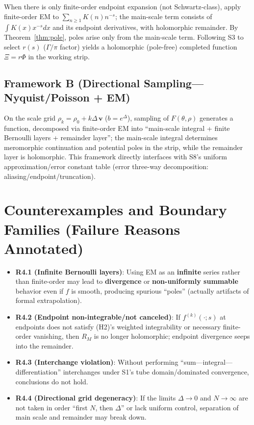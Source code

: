 \documentclass[11pt,a4paper]{article}
\theoremstyle{remark}
\begin{document}
When there is only finite-order endpoint expansion (not Schwartz-class), apply finite-order EM to $\sum_{n\ge1}K(n)n^{-s}$; the main-scale term consists of $\int K(x)x^{-s}dx$ and its endpoint derivatives, with holomorphic remainder. By Theorem~\ref{thm:pole}, poles arise only from the main-scale term. Following S3 to select $r(s)$ ($\Gamma/\pi$ factor) yields a holomorphic (pole-free) completed function $\Xi=r\Phi$ in the working strip.

\subsection{Framework B (Directional Sampling---Nyquist/Poisson + EM)}

On the scale grid $\rho_k=\rho_0+k\Delta\,\mathbf{v}$ ($b=e^\Delta$), sampling of $F(\theta,\rho)$ generates a function, decomposed via finite-order EM into ``main-scale integral + finite Bernoulli layers + remainder layer''; the main-scale integral determines meromorphic continuation and potential poles in the strip, while the remainder layer is holomorphic. This framework directly interfaces with S8's uniform approximation/error constant table (error three-way decomposition: aliasing/endpoint/truncation).

\section{Counterexamples and Boundary Families (Failure Reasons Annotated)}

\begin{itemize}
\item \textbf{R4.1 (Infinite Bernoulli layers)}: Using EM as an \textbf{infinite} series rather than finite-order may lead to \textbf{divergence} or \textbf{non-uniformly summable} behavior even if $f$ is smooth, producing spurious ``poles'' (actually artifacts of formal extrapolation).

\item \textbf{R4.2 (Endpoint non-integrable/not canceled)}: If $f^{(k)}(\cdot;s)$ at endpoints does not satisfy (H2)'s weighted integrability or necessary finite-order vanishing, then $R_M$ is no longer holomorphic; endpoint divergence seeps into the remainder.

\item \textbf{R4.3 (Interchange violation)}: Without performing ``sum---integral---differentiation'' interchanges under S1's tube domain/dominated convergence, conclusions do not hold.

\item \textbf{R4.4 (Directional grid degeneracy)}: If the limits $\Delta\to0$ and $N\to\infty$ are not taken in order ``first $N$, then $\Delta$'' or lack uniform control, separation of main scale and remainder may break down.
\end{itemize}
\end{document}
